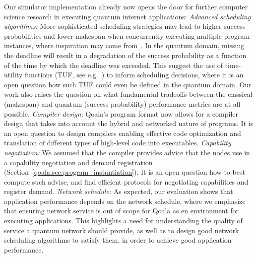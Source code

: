 Our simulator implementation already now opens the door for further computer science research in executing quantum internet applications:
\textit{Advanced scheduling algorithms:}
More sophisticated scheduling strategies may lead to higher success probabilities and lower makespan when concurrently executing multiple program instances, where inspiration may come from~\cite{topcuoglu2002performance, baruah2011scheduling, andersson2006multiprocessor, polychronopoulos1991hierarchical}. 
In the quantum domain, missing the deadline will result in a degradation of the success probability as a function of the time by which the deadline was exceeded.
This suggest the use of time-utility functions (TUF, see e.g.~\cite{jensen1993timeliness, li2004utility}) to inform scheduling decisions, where it is an open question how such TUF could even be defined in the quantum domain.
Our work also raises the question on what fundamental tradeoffs between the classical (makespan) and quantum (success probability) performance metrics are at all possible.
\textit{Compiler design:}
Qoala's program format now allows for a compiler design that takes into account the hybrid and networked nature of programs.
It is an open question to design compilers enabling effective code optimization and translation of different types of high-level code into executables.
\textit{Capability negotiation:}
We assumed that the compiler provides advice that the nodes use in a capability negotiation and demand registration (Section~\ref{qoala:sec:program_instantiation}).
It is an open question how to best compute such advise, and find efficient protocols for negotiating capabilities and register demand.
\textit{Network schedule:}
As expected, our evaluation shows that application performance depends on the network schedule, where we emphasize that ensuring network service is out of scope for Qoala as en environment for executing applications.
This highlights a need for understanding the quality of service a quantum network should provide, as well as to design good network scheduling algorithms to satisfy them, in order to achieve good application performance.

